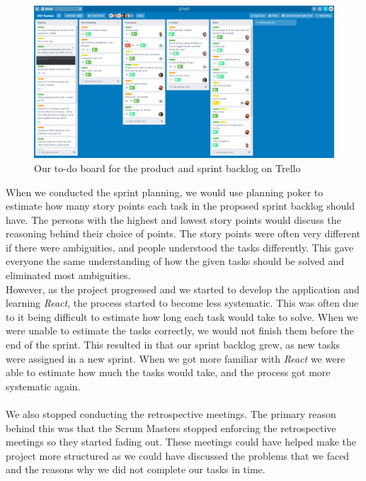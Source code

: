 \begin{figure}[H]
    \centering
    \includegraphics[width=0.8\linewidth]{figures/trellopicture.PNG}
    \caption{Our to-do board for the product and sprint backlog on Trello}
    \label{fig:trello-board}
\end{figure}
\noindent
When we conducted the sprint planning, we would use planning poker to estimate how many story points each task in the proposed sprint backlog should have.
The persons with the highest and lowest story points would discuss the reasoning behind their choice of points.
The story points were often very different if there were ambiguities, and people understood the tasks differently.
This gave everyone the same understanding of how the given tasks should be solved and eliminated most ambiguities. 
\\
However, as the project progressed and we started to develop the application and learning \textit{React}, the process started to become less systematic.
This was often due to it being difficult to estimate how long each task would take to solve.
When we were unable to estimate the tasks correctly, we would not finish them before the end of the sprint. 
This resulted in that our sprint backlog grew, as new tasks were assigned in a new sprint.
When we got more familiar with \textit{React} we were able to estimate how much the tasks would take, and the process got more systematic again.
\\\\
We also stopped conducting the retrospective meetings.
The primary reason behind this was that the Scrum Masters stopped enforcing the retrospective meetings so they started fading out.
These meetings could have helped make the project more structured as we could have discussed the problems that we faced and the reasons why we did not complete our tasks in time.

